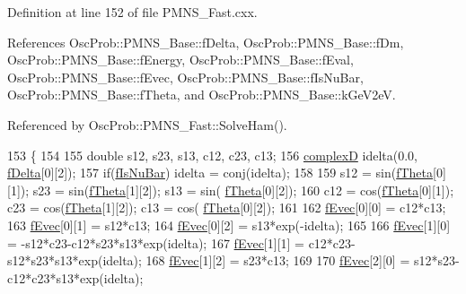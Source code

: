 Definition at line 152 of file P\+M\+N\+S\+\_\+\+Fast.\+cxx.



References Osc\+Prob\+::\+P\+M\+N\+S\+\_\+\+Base\+::f\+Delta, Osc\+Prob\+::\+P\+M\+N\+S\+\_\+\+Base\+::f\+Dm, Osc\+Prob\+::\+P\+M\+N\+S\+\_\+\+Base\+::f\+Energy, Osc\+Prob\+::\+P\+M\+N\+S\+\_\+\+Base\+::f\+Eval, Osc\+Prob\+::\+P\+M\+N\+S\+\_\+\+Base\+::f\+Evec, Osc\+Prob\+::\+P\+M\+N\+S\+\_\+\+Base\+::f\+Is\+Nu\+Bar, Osc\+Prob\+::\+P\+M\+N\+S\+\_\+\+Base\+::f\+Theta, and Osc\+Prob\+::\+P\+M\+N\+S\+\_\+\+Base\+::k\+Ge\+V2eV.



Referenced by Osc\+Prob\+::\+P\+M\+N\+S\+\_\+\+Fast\+::\+Solve\+Ham().


\begin{DoxyCode}
153 \{
154 
155   \textcolor{keywordtype}{double}  s12, s23, s13, c12, c23, c13;
156   \hyperlink{EigenPoint_8h_a67ca8e107e20610c3fff78d5e726ece0}{complexD} idelta(0.0, \hyperlink{classOscProb_1_1PMNS__Base_ab2a5fa40e689b221c8a7d2c17213810d}{fDelta}[0][2]);
157   \textcolor{keywordflow}{if}(\hyperlink{classOscProb_1_1PMNS__Base_a0ebaeaefab36a3ff381c6293faedfdd6}{fIsNuBar}) idelta = conj(idelta);
158 
159   s12 = sin(\hyperlink{classOscProb_1_1PMNS__Base_a1976887cd658dd86b2336c181f1470b4}{fTheta}[0][1]);  s23 = sin(\hyperlink{classOscProb_1_1PMNS__Base_a1976887cd658dd86b2336c181f1470b4}{fTheta}[1][2]);  s13 = sin(
      \hyperlink{classOscProb_1_1PMNS__Base_a1976887cd658dd86b2336c181f1470b4}{fTheta}[0][2]);
160   c12 = cos(\hyperlink{classOscProb_1_1PMNS__Base_a1976887cd658dd86b2336c181f1470b4}{fTheta}[0][1]);  c23 = cos(\hyperlink{classOscProb_1_1PMNS__Base_a1976887cd658dd86b2336c181f1470b4}{fTheta}[1][2]);  c13 = cos(
      \hyperlink{classOscProb_1_1PMNS__Base_a1976887cd658dd86b2336c181f1470b4}{fTheta}[0][2]);
161 
162   \hyperlink{classOscProb_1_1PMNS__Base_a87be137356c5f27ab83cab5e1298ef8f}{fEvec}[0][0] =  c12*c13;
163   \hyperlink{classOscProb_1_1PMNS__Base_a87be137356c5f27ab83cab5e1298ef8f}{fEvec}[0][1] =  s12*c13;
164   \hyperlink{classOscProb_1_1PMNS__Base_a87be137356c5f27ab83cab5e1298ef8f}{fEvec}[0][2] =  s13*exp(-idelta);
165 
166   \hyperlink{classOscProb_1_1PMNS__Base_a87be137356c5f27ab83cab5e1298ef8f}{fEvec}[1][0] = -s12*c23-c12*s23*s13*exp(idelta);
167   \hyperlink{classOscProb_1_1PMNS__Base_a87be137356c5f27ab83cab5e1298ef8f}{fEvec}[1][1] =  c12*c23-s12*s23*s13*exp(idelta);
168   \hyperlink{classOscProb_1_1PMNS__Base_a87be137356c5f27ab83cab5e1298ef8f}{fEvec}[1][2] =  s23*c13;
169 
170   \hyperlink{classOscProb_1_1PMNS__Base_a87be137356c5f27ab83cab5e1298ef8f}{fEvec}[2][0] =  s12*s23-c12*c23*s13*exp(idelta);

\end{DoxyCode}
